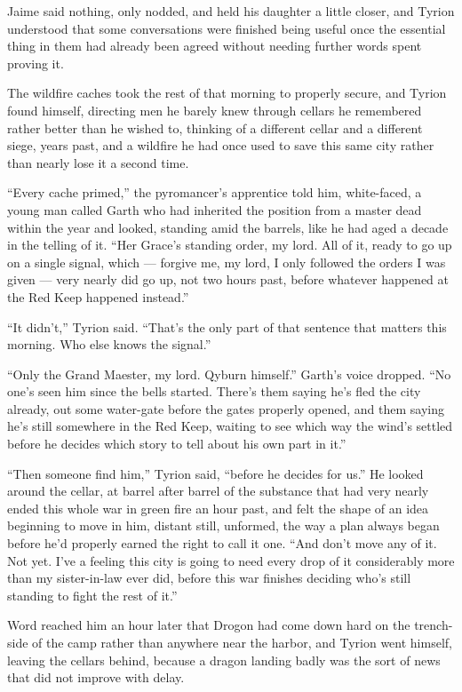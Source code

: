 Jaime said nothing, only nodded, and held his daughter a little closer, and Tyrion understood that some conversations were finished being useful once the essential thing in them had already been agreed without needing further words spent proving it.

\sceneBreak

The wildfire caches took the rest of that morning to properly secure, and Tyrion found himself, directing men he barely knew through cellars he remembered rather better than he wished to, thinking of a different cellar and a different siege, years past, and a wildfire he had once used to save this same city rather than nearly lose it a second time.

“Every cache primed,” the pyromancer’s apprentice told him, white-faced, a young man called Garth who had inherited the position from a master dead within the year and looked, standing amid the barrels, like he had aged a decade in the telling of it. “Her Grace’s standing order, my lord. All of it, ready to go up on a single signal, which — forgive me, my lord, I only followed the orders I was given — very nearly did go up, not two hours past, before whatever happened at the Red Keep happened instead.”

“It didn’t,” Tyrion said. “That’s the only part of that sentence that matters this morning. Who else knows the signal.”

“Only the Grand Maester, my lord. Qyburn himself.” Garth’s voice dropped. “No one’s seen him since the bells started. There’s them saying he’s fled the city already, out some water-gate before the gates properly opened, and them saying he’s still somewhere in the Red Keep, waiting to see which way the wind’s settled before he decides which story to tell about his own part in it.”

“Then someone find him,” Tyrion said, “before he decides for us.” He looked around the cellar, at barrel after barrel of the substance that had very nearly ended this whole war in green fire an hour past, and felt the shape of an idea beginning to move in him, distant still, unformed, the way a plan always began before he’d properly earned the right to call it one. “And don’t move any of it. Not yet. I’ve a feeling this city is going to need every drop of it considerably more than my sister-in-law ever did, before this war finishes deciding who’s still standing to fight the rest of it.”

\sceneBreak

Word reached him an hour later that Drogon had come down hard on the trench-side of the camp rather than anywhere near the harbor, and Tyrion went himself, leaving the cellars behind, because a dragon landing badly was the sort of news that did not improve with delay.

